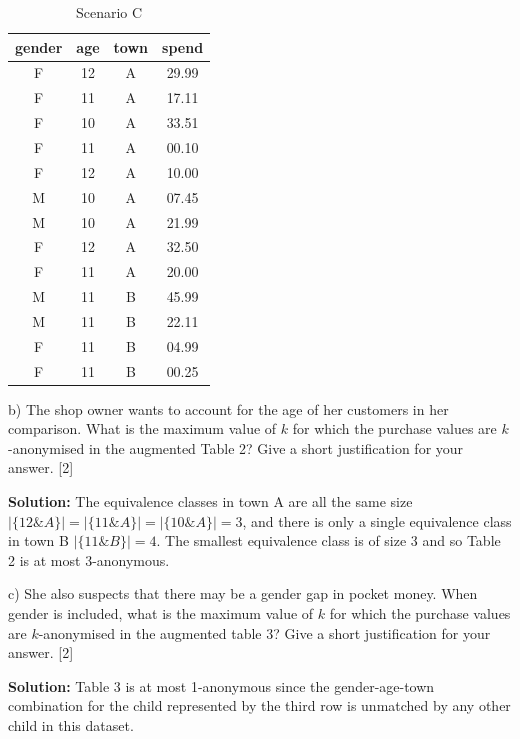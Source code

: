 \documentclass[a4paper, 11pt]{article}
\begin{document}
\begin{table}[hbtp]
    \begin{minipage}{0.45\textwidth}   
    \centering 
    \begin{tabular}{ccc|c}
        gender & age & town & spend \\
        \hline
        F      & 12  & A    & 29.99 \\
        F      & 11  & A    & 17.11 \\
        F      & 10  & A    & 33.51 \\
        F      & 11  & A    & 00.10 \\
        F      & 12  & A    & 10.00 \\
        M      & 10  & A    & 07.45 \\
        M      & 10  & A    & 21.99 \\
        F      & 12  & A    & 32.50 \\
        F      & 11  & A    & 20.00 \\
        M      & 11  & B    & 45.99 \\
        M      & 11  & B    & 22.11 \\
        F      & 11  & B    & 04.99 \\
        F      & 11  & B    & 00.25 \\
    \end{tabular}
    \caption{Scenario C}
    \end{minipage}
    
    \label{tab:my_label}
\end{table}


b) The shop owner wants to account for the age of her customers in her comparison. What is the maximum value of $k$ for which the purchase values are $k$-anonymised in the augmented Table 2? Give a short justification for your answer. [2]

{\color{blue}
\textbf{Solution:} The equivalence classes in town A are all the same size $|\{12 \& A\}| = |\{11 \& A\}| = |\{10 \& A\}| = 3$, and there is only a single equivalence class in town B $|\{11 \& B\}| = 4$. The smallest equivalence class is of size 3 and so Table 2 is at most 3-anonymous.
}

c) She also suspects that there may be a gender gap in pocket money. When gender is included, what is the maximum value of $k$ for which the purchase values are $k$-anonymised in the augmented table 3? Give a short justification for your answer. [2]

{\color{blue}
\textbf{Solution:} Table 3 is at most 1-anonymous since the gender-age-town combination for the child represented by the third row is unmatched by any other child in this dataset. 
} 
\end{document}
